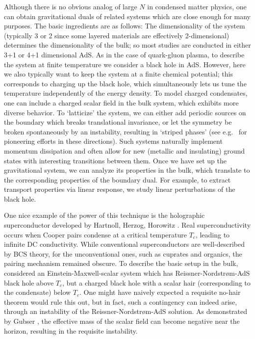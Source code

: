 \documentclass[12pt,a4paper]{article}
\def\RN{Reissner-Nordstr\o m}
\begin{document}
Although there is no obvious analog of large $N$ in condensed matter physics, one can obtain gravitational duals of  related  systems which are close enough for many purposes.  The basic ingredients are as follows:  The dimensionality of the system (typically 3 or 2 since some layered materials are effectively 2-dimensional) determines the dimensionality of the bulk; so most studies are conducted in either 3+1 or 4+1 dimensional AdS.  As in the case of quark-gluon plasma, to describe the system at finite temperature we consider a black hole in AdS.  However, here we also typically want to keep the system at a finite chemical potential; this corresponds to charging up the black hole, which simultaneously lets us tune the temperature independently of the energy density.  To model charged condensates, one can include a charged scalar field in the bulk system, which exhibits more diverse behavior.   To `latticize' the system, we can either add periodic sources on the boundary which breaks translational invariance, or let the symmetry be broken spontaneously by an instability, resulting in `striped phases' (see e.g.\  \cite{Horowitz:2012ky,Donos:2011bh} for pioneering efforts in these directions).  Such systems naturally implement momentum dissipation and often allow for new (metallic and insulating) ground states with interesting transitions between them.
Once we have set up the gravitational system, we can analyze its properties in the bulk, which translate to the corresponding properties of the boundary dual.   For example, to extract transport properties via linear response, we study linear perturbations of the black hole. 

One nice example of the power of this technique is the holographic superconductor developed by Hartnoll, Herzog, Horowitz \cite{Hartnoll:2008vx}.  Real superconductivity occurs when Cooper pairs condense at a critical temperature $T_c$, leading to infinite DC conductivity.  While conventional superconductors are well-described by BCS theory, for the unconventional ones, such as cuprates and organics, the pairing mechanism remained obscure.
To describe the basic setup in the bulk, \cite{Hartnoll:2008vx} considered an Einstein-Maxwell-scalar system which has \RN-AdS black hole above $T_c$, but a charged black hole with a scalar hair (corresponding to the condensate) below $T_c$.  One might have naively expected a requisite no-hair theorem would rule this out, but in fact, such a contingency can indeed arise, through an instability of the \RN-AdS solution.  As demonstrated by Gubser \cite{Gubser:2008px}, the effective mass of the scalar field can become negative near the horizon, resulting in the requisite instability.
\end{document}
